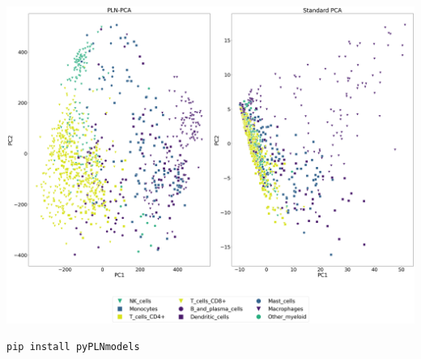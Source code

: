 \documentclass{beamer}
\begin{document}
\begin{frame}
    \includegraphics[width = \linewidth]{figures/plnpca_vs_pca_last.png}
\end{frame}



\begin{frame}
     \centering \Huge \texttt{pip install pyPLNmodels}

\end{frame}
\end{document}
